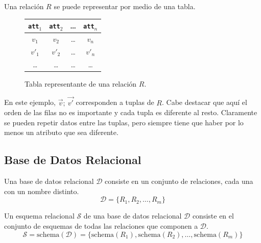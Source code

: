 
Una relación $R$ se puede representar por medio de una tabla.

\begin{figure}[h]
  \centering
  \begin{tabular}{|c|c|c|c|}
    \hline
    \texttt{att$_1$} & \texttt{att$_2$} & \ldots & \texttt{att$_n$} \\\hline
    $v_1$ & $v_2$ & \ldots & $v_n$ \\\hline
    $v'_1$ & $v'_2$ & \ldots & $v'_n$ \\\hline
    \ldots & \ldots & \ldots & \ldots \\\hline
  \end{tabular}
  \caption{Tabla representante de una relación $R$.}
\end{figure}

En este ejemplo, $\vec{v};\ \vec{v'}$ corresponden a tuplas de $R$. Cabe destacar que aquí el orden de las filas no es importante y cada tupla es diferente al resto. Claramente se pueden repetir datos entre las tuplas, pero siempre tiene que haber por lo menos un atributo que sea diferente.

\subsection{Base de Datos Relacional}
Una base de datos relacional $\mathcal{D}$ consiste en un conjunto de relaciones, cada una con un nombre distinto.
\[ \mathcal{D} = \{R_1, R_2, \ldots, R_m\} \]

Un esquema relacional $\mathcal{S}$ de una base de datos relacional $\mathcal{D}$ consiste en el conjunto de esquemas de todas las relaciones que componen a $\mathcal{D}$.
\[ \mathcal{S} = \text{schema}(\mathcal{D}) = \{ \text{schema}(R_1), \text{schema}(R_2), \ldots, \text{schema}(R_m) \} \]

